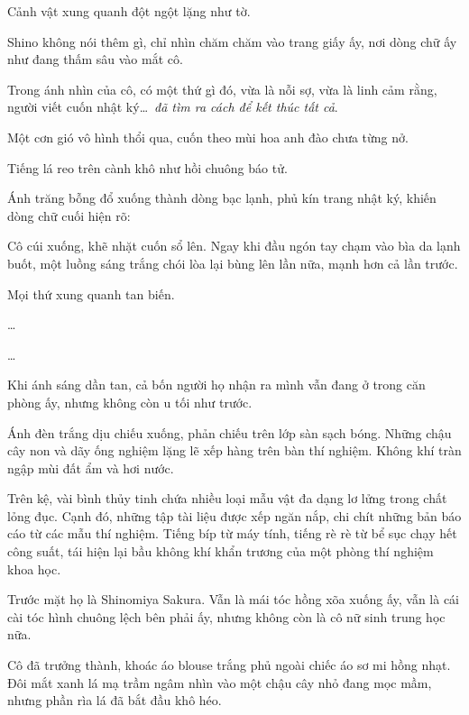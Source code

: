 \documentclass[../main.tex]{subfiles}
\begin{document}

Cảnh vật xung quanh đột ngột lặng như tờ.

Shino không nói thêm gì, chỉ nhìn chăm chăm vào trang giấy ấy, nơi dòng chữ ấy như đang thấm sâu vào mắt cô.

Trong ánh nhìn của cô, có một thứ gì đó, vừa là nỗi sợ, vừa là linh cảm rằng, người viết cuốn nhật ký\dots\ \emph{đã tìm ra cách để kết thúc tất cả}.

Một cơn gió vô hình thổi qua, cuốn theo mùi hoa anh đào chưa từng nở.

Tiếng lá reo trên cành khô như hồi chuông báo tử.

Ánh trăng bỗng đổ xuống thành dòng bạc lạnh, phủ kín trang nhật ký, khiến dòng chữ cuối hiện rõ:


Cô cúi xuống, khẽ nhặt cuốn sổ lên. Ngay khi đầu ngón tay chạm vào bìa da lạnh buốt, một luồng sáng trắng chói lòa lại bùng lên lần nữa, mạnh hơn cả lần trước.

Mọi thứ xung quanh tan biến.

\dots

\dots

\ct

Khi ánh sáng dần tan, cả bốn người họ nhận ra mình vẫn đang ở trong căn phòng ấy, nhưng không còn u tối như trước.

Ánh đèn trắng dịu chiếu xuống, phản chiếu trên lớp sàn sạch bóng. Những chậu cây non và dãy ống nghiệm lặng lẽ xếp hàng trên bàn thí nghiệm. Không khí tràn ngập mùi đất ẩm và hơi nước.

Trên kệ, vài bình thủy tinh chứa nhiều loại mẫu vật đa dạng lơ lửng trong chất lỏng đục. Cạnh đó, những tập tài liệu được xếp ngăn nắp, chi chít những bản báo cáo từ các mẫu thí nghiệm. Tiếng bíp từ máy tính, tiếng rè rè từ bể sục chạy hết công suất, tái hiện lại bầu không khí khẩn trương của một phòng thí nghiệm khoa học.

Trước mặt họ là Shinomiya Sakura. Vẫn là mái tóc hồng xõa xuống ấy, vẫn là cái cài tóc hình chuông lệch bên phải ấy, nhưng không còn là cô nữ sinh trung học nữa.

Cô đã trưởng thành, khoác áo blouse trắng phủ ngoài chiếc áo sơ mi hồng nhạt. Đôi mắt xanh lá mạ trầm ngâm nhìn vào một chậu cây nhỏ đang mọc mầm, nhưng phần rìa lá đã bắt đầu khô héo.

\end{document}

